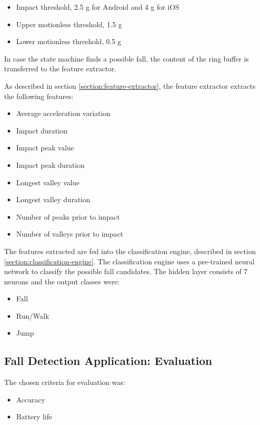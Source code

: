 \documentclass[12pt, a4paper, onecolumn]{article}
\begin{document}
	\begin{itemize}
		\item Impact threshold, 2.5 g for Android and 4 g for iOS
		\item Upper motionless threshold, 1.5 g
		\item Lower motionless threshold, 0.5 g
	\end{itemize}
	
	In case the state machine finds a possible fall, the content of the ring buffer is transferred to the feature extractor.
	
	As described in section \ref{section:feature-extractor}, the feature extractor extracts the following features:
	
	\begin{itemize}
		\item Average acceleration variation
		\item Impact duration
		\item Impact peak value
		\item Impact peak duration
		\item Longest valley value
		\item Longest valley duration
		\item Number of peaks prior to impact
		\item Number of valleys prior to impact
	\end{itemize}
	
	The features extracted are fed into the classification engine, described in section \ref{section:classification-engine}. The classification engine uses a pre-trained neural network to classify the possible fall candidates. The hidden layer consists of 7 neurons and the output classes were:
	
	\begin{itemize}
		\item Fall
		\item Run/Walk
		\item Jump
	\end{itemize}
	
	\subsection{Fall Detection Application: Evaluation}
	
	The chosen criteria for evaluation was:
	
	\begin{itemize}
		\item Accuracy
		\item Battery life
	\end{itemize}  
	
\end{document}
